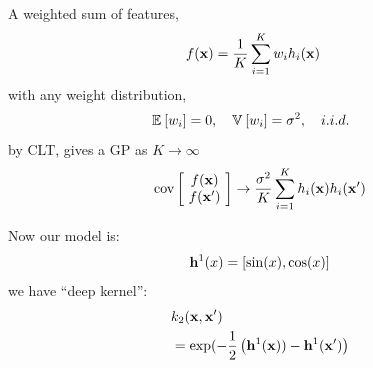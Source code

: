 \newsavebox\unistrain
\begin{lrbox}{\unistrain}
\hspace{0.1cm}
  \begin{minipage}{0.53\textwidth}
A weighted sum of features,
    \begin{align*}
f(\vx) & %
= \frac{1}{K} \sum_{i=1}^K \netweights_i \onefeat_i(\vx)
    \end{align*} 
with any weight distribution,
    \begin{align*}
\mathbb{E}_{} \left[ {w_i} \right] & = 0, \quad \mathbb{V}_{} \left[ {w_i} \right] = \sigma^2, \quad i.i.d.\ 
    \end{align*} 
by CLT, gives a GP as $K \to \infty$
        \begin{align*}
\operatorname{cov} \left[ \! \begin{array}{c} f({\bf{x}}) \\ f({\bf{x}}') \end{array} \! \right] \to \frac{\sigma^2}{K}\sum_{i=1}^K h_i({\bf{x}})h_i({\bf{x}}')
    \end{align*} 
  \end{minipage}
\end{lrbox}



\newsavebox\deepkernelstwo
\begin{lrbox}{\deepkernelstwo}
  \begin{minipage}{0.4\textwidth}
Now our model is:
    \begin{align*}
{\bf{h}}^{1}(x) = \left[ \sin(x), \cos(x) \right]
    \end{align*} 
	we have ``deep kernel'':
	\begin{align*}
	& k_2({\bf{x}}, {\bf{x}}') \\ 
	& = \exp(-\frac{1}{2} \left( {\bf{h}}^{1}({\bf{x}})) - {\bf{h}}^{1}({\bf{x}}') \right)
	\end{align*}
  \end{minipage}
\end{lrbox}

